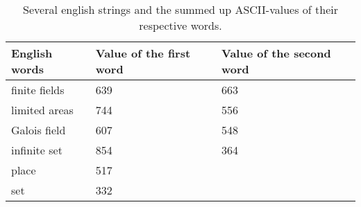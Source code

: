 \begin{table}[h!tb]
    \centering
    \begin{tabularx}{\textwidth}{X X X}
        \toprule
            English words & Value of the first word & Value of the second word \\
        \midrule
            finite fields & 639 & 663 \\[-13px]
            limited areas & 744 & 556 \\[1em]
        \midrule
            Galois field & 607 & 548 \\[-13px]
            infinite set & 854 & 364 \\[1em]
        \midrule
            place & 517 & \\[-13px]
            set & 332 \\[-1em]
        \bottomrule
    \end{tabularx}
    \caption{Several english strings and the summed up ASCII-values of their respective words.}
\end{table}
